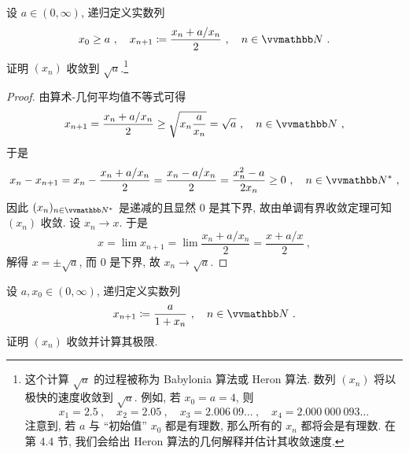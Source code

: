 \begin{exercise}[Heron 算法]\label{ex:heron-method}
    设 \(a \in (0, \infty)\), 递归定义实数列
    \[
        x_0 \geq a\ ,\quad x_{n + 1} \coloneqq \frac{x_n + a / x_n}{2}\ ,\quad n \in \N\ .
    \]
    证明 \((x_n)\) 收敛到 \(\sqrt{a}\).\footnote{这个计算 \(\sqrt{a}\) 的过程被称为 Babylonia 算法或 Heron 算法. 数列 \((x_n)\) 将以极快的速度收敛到 \(\sqrt{a}\). 例如, 若 \(x_0 = a = 4\), 则
    \[
        x_1 = 2.5\ ,\quad x_2 = 2.05\ ,\quad x_3 = 2.006\ 09 \ldots\ ,\quad x_4 = 2.000\ 000\ 093 \ldots
    \]
    注意到, 若 \(a\) 与 ``初始值'' \(x_0\) 都是有理数, 那么所有的 \(x_n\) 都将会是有理数. 在第 4.4 节, 我们会给出 Heron 算法的几何解释并估计其收敛速度.}
\end{exercise}

\begin{proof}
    由算术-几何平均值不等式可得
    \[
        x_{n + 1} = \frac{x_n + a / x_n}{2} \geq \sqrt{x_n \frac{a}{x_n}} = \sqrt{a}\ ,\quad n \in \N\ ,
    \]
    于是
    \[
        x_n - x_{n + 1} = x_n - \frac{x_n + a / x_n}{2} = \frac{x_n - a / x_n}{2} = \frac{x_n^2 - a}{2 x_n} \geq 0\ ,\quad n \in \N^\ast\ ,
    \]
    因此 \((x_n)_{n \in \N^\ast}\) 是递减的且显然 \(0\) 是其下界, 故由单调有界收敛定理可知 \((x_n)\) 收敛. 设 \(x_n \to x\). 于是
    \[
        x = \lim x_{n + 1} = \lim \frac{x_n + a / x_n}{2} = \frac{x + a / x}{2}\ ,
    \]
    解得 \(x = \pm \sqrt{a}\), 而 \(0\) 是下界, 故 \(x_n \to \sqrt{a}\).
\end{proof}

\begin{exercise}
    设 \(a, x_0 \in (0, \infty)\), 递归定义实数列
    \[
        x_{n + 1} \coloneqq \frac{a}{1 + x_n}\ ,\quad n \in \N\ .
    \]
    证明 \((x_n)\) 收敛并计算其极限.
\end{exercise}

